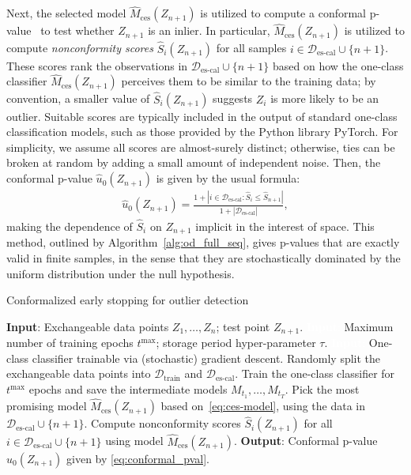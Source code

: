 Next, the selected model $\hat{M}_{\text{ces}}(Z_{n+1})$ is utilized to compute a conformal p-value~\citep{bates2021testing} to test whether $Z_{n+1}$ is an inlier.
In particular, $\hat{M}_{\text{ces}}(Z_{n+1})$ is utilized to compute {\em nonconformity scores} $\hat{S}_i(Z_{n+1})$ for all samples $i \in \mathcal{D}_{\text{es-cal}} \cup \{n+1\}$. These scores rank the observations in $\mathcal{D}_{\text{es-cal}} \cup \{n+1\}$ based on how the one-class classifier $\hat{M}_{\text{ces}}(Z_{n+1})$ perceives them to be similar to the training data; by convention, a smaller value of $\hat{S}_i(Z_{n+1})$ suggests $Z_i$ is more likely to be an outlier.
Suitable scores are typically included in the output of standard one-class classification models, such as those provided by the Python library PyTorch.
For simplicity, we assume all scores are almost-surely distinct; otherwise, ties can be broken at random by adding a small amount of independent noise. Then, the conformal p-value $\hat{u}_0(Z_{n+1})$ is given by the usual formula:
\begin{align}\label{eq:conformal_pval}
    \hat{u}_0(Z_{n+1}) = \frac{1 + |i \in \mathcal{D}_{\text{es-cal}}: \hat{S}_{i} \leq \hat{S}_{n+1}|}{1+|\mathcal{D}_{\text{es-cal}}|},
\end{align}
making the dependence of $\hat{S}_{i}$ on $Z_{n+1}$ implicit in the interest of space.
This method, outlined by Algorithm~\ref{alg:od_full_seq}, gives p-values that are exactly valid in finite samples, in the sense that they are stochastically dominated by the uniform distribution under the null hypothesis.
\begin{algorithm}[H]
    \caption{Conformalized early stopping for outlier detection}
    \label{alg:od_full_seq}
    \begin{algorithmic}[1]
        \STATE \textbf{Input}: Exchangeable data points $Z_1, \ldots, Z_n$; test point $Z_{n+1}$.
        \STATE \textcolor{white}{\textbf{Input}:} Maximum number of training epochs $t^{\text{max}}$; storage period hyper-parameter $\tau$.
        \STATE \textcolor{white}{\textbf{Input}:} One-class classifier trainable via (stochastic) gradient descent.
        \STATE Randomly split the exchangeable data points into $\mathcal{D}_{\text{train}}$ and $\mathcal{D}_{\text{es-cal}}$.
        \STATE Train the one-class classifier for $t^{\text{max}}$ epochs and save the intermediate models $M_{t_1} , \dots, M_{t_T}$.
        \STATE Pick the most promising model $\hat{M}_{\text{ces}}(Z_{n+1})$ based on~\eqref{eq:ces-model}, using the data in $\mathcal{D}_{\text{es-cal}} \cup \{n+1\}$.
        \STATE Compute nonconformity scores $\hat{S}_i(Z_{n+1})$ for all $i \in \mathcal{D}_{\text{es-cal}} \cup \{n+1\}$ using model $\hat{M}_{\text{ces}}(Z_{n+1})$.
        \STATE \textbf{Output}: Conformal p-value $\hat{u}_0(Z_{n+1})$ given by \eqref{eq:conformal_pval}.
    \end{algorithmic}
\end{algorithm}

